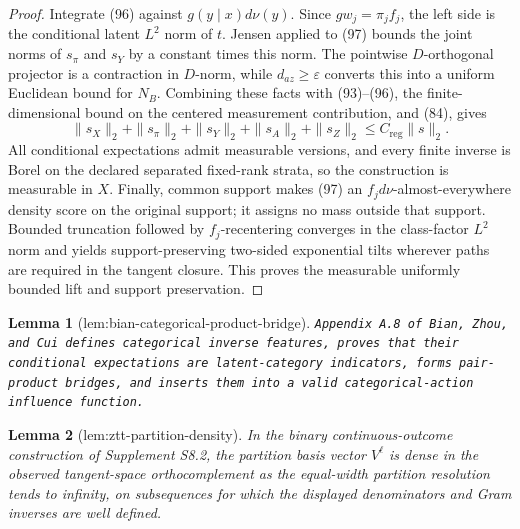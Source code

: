 \documentclass{article}
\newtheorem{lemma}{Lemma}
\begin{document}
\begin{proof}
Integrate (96) against \(g(y\mid x)d\nu(y)\).  Since \(gw_j=\pi_jf_j\), the left side is the conditional latent \(L^2\) norm of \(t\).  Jensen applied to (97) bounds the joint norms of \(s_\pi\) and \(s_Y\) by a constant times this norm.  The pointwise \(D\)-orthogonal projector is a contraction in \(D\)-norm, while \(d_{az}\geq\varepsilon\) converts this into a uniform Euclidean bound for \(N_B\).  Combining these facts with (93)--(96), the finite-dimensional bound on the centered measurement contribution, and (84), gives
\[
 \|s_X\|_2+\|s_\pi\|_2+\|s_Y\|_2+\|s_A\|_2+\|s_Z\|_2
 \leq C_{\mathrm{reg}}\|s\|_2. \tag{99}
\]
All conditional expectations admit measurable versions, and every finite inverse is Borel on the declared separated fixed-rank strata, so the construction is measurable in \(X\).  Finally, common support makes (97) an \(f_jd\nu\)-almost-everywhere density score on the original support; it assigns no mass outside that support.  Bounded truncation followed by \(f_j\)-recentering converges in the class-factor \(L^2\) norm and yields support-preserving two-sided exponential tilts wherever paths are required in the tangent closure.  This proves the measurable uniformly bounded lift and support preservation.
\end{proof}

\begin{lemma}[lem:bian-categorical-product-bridge]\label{lem:bian-categorical-product-bridge}
\texttt{Appendix A.8 of Bian,\allowbreak{} Zhou,\allowbreak{} and Cui defines categorical inverse features,\allowbreak{} proves that their conditional expectations are latent-\allowbreak{}category indicators,\allowbreak{} forms pair-\allowbreak{}product bridges,\allowbreak{} and inserts them into a valid categorical-\allowbreak{}action influence function.}
\end{lemma}

\begin{lemma}[lem:ztt-partition-density]\label{lem:ztt-partition-density}
In the binary continuous-outcome construction of Supplement S8.2, the partition basis vector \(V^\ell\) is dense in the observed tangent-space orthocomplement as the equal-width partition resolution tends to infinity, on subsequences for which the displayed denominators and Gram inverses are well defined.
\end{lemma}
\end{document}
